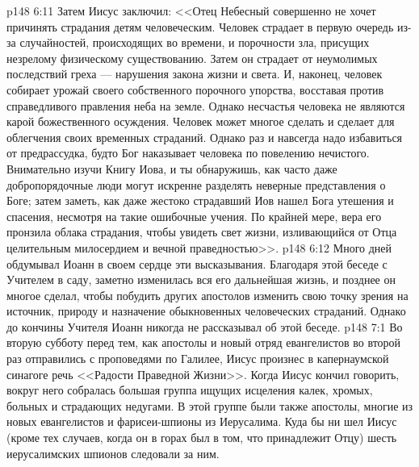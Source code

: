 \vs p148 6:11 Затем Иисус заключил: <<Отец Небесный совершенно не хочет причинять страдания детям человеческим. Человек страдает в первую очередь из\hyp{}за случайностей, происходящих во времени, и порочности зла, присущих незрелому физическому существованию. Затем он страдает от неумолимых последствий греха --- нарушения закона жизни и света. И, наконец, человек собирает урожай своего собственного порочного упорства, восставая против справедливого правления неба на земле. Однако несчастья человека не являются  карой божественного осуждения. Человек может многое сделать и сделает для облегчения своих временных страданий. Однако раз и навсегда надо избавиться от предрассудка, будто Бог наказывает человека по повелению нечистого. Внимательно изучи Книгу Иова, и ты обнаружишь, как часто даже добропорядочные люди могут искренне разделять неверные представления о Боге; затем заметь, как даже жестоко страдавший Иов нашел Бога утешения и спасения, несмотря на такие ошибочные учения. По крайней мере, вера его пронзила облака страдания, чтобы увидеть свет жизни, изливающийся от Отца целительным милосердием и вечной праведностью>>.
\vs p148 6:12 Много дней обдумывал Иоанн в своем сердце эти высказывания. Благодаря этой беседе с Учителем в саду, заметно изменилась вся его дальнейшая жизнь, и позднее он многое сделал, чтобы побудить других апостолов изменить свою точку зрения на источник, природу и назначение обыкновенных человеческих страданий. Однако до кончины Учителя Иоанн никогда не рассказывал об этой беседе.
\vs p148 7:1 Во вторую субботу перед тем, как апостолы и новый отряд евангелистов во второй раз отправились с проповедями по Галилее, Иисус произнес в капернаумской синагоге речь <<Радости Праведной Жизни>>. Когда Иисус кончил говорить, вокруг него собралась большая группа ищущих исцеления калек, хромых, больных и страдающих недугами. В этой группе были также апостолы, многие из новых евангелистов и фарисеи\hyp{}шпионы из Иерусалима. Куда бы ни шел Иисус (кроме тех случаев, когда он в горах был в том, что принадлежит Отцу) шесть иерусалимских шпионов следовали за ним.
